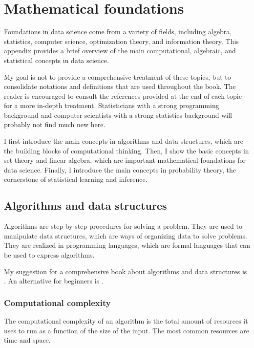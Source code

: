 \chapter{Mathematical foundations}
\label{chap:preliminaries}

Foundations in data science come from a variety of fields, including
algebra, statistics, computer science, optimization theory, and information theory.
This appendix provides a brief overview of the main computational, algebraic, and statistical
concepts in data science.

My goal is not to provide a comprehensive treatment of these topics, but to consolidate
notations and definitions that are used throughout the book.  The reader is encouraged to
consult the references provided at the end of each topic for a more in-depth treatment.
Statisticians with a strong programming background and computer scientists with a strong
statistics background will probably not find much new here.

I first introduce the main concepts in algorithms and data structures, which are the
building blocks of computational thinking.  Then, I show the basic concepts in set
theory and linear algebra, which are important mathematical foundations for data science.
Finally, I introduce the main concepts in probability theory, the cornerstone of
statistical learning and inference.

\section{Algorithms and data structures}

Algorithms are step-by-step procedures for solving a problem.  They are used to
manipulate data structures, which are ways of organizing data to solve problems.
They are realized in programming languages, which are formal languages that can be used
to express algorithms.

My suggestion for a comprehensive book about algorithms and data structures is
\textcite{Cormen2022}.  An alternative for beginners is
\textcite{Guttag2021}.

\subsection{Computational complexity}

The computational complexity of an algorithm is the total amount of resources it uses to
run as a function of the size of the input.  The most common resources are time and
space.

